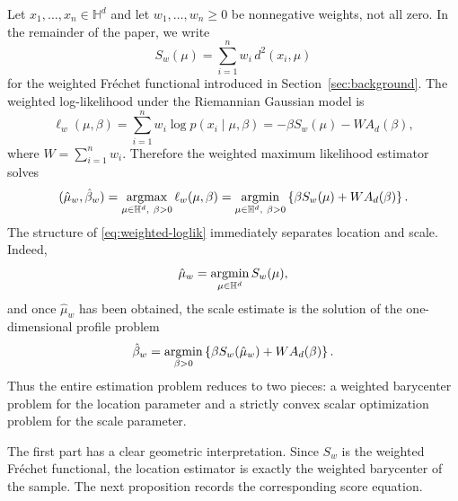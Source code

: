 \documentclass[11pt]{article}
\begin{document}
Let \(x_1,\ldots,x_n\in\mathbb{H}^d\) and let \(w_1,\ldots,w_n\ge 0\) be nonnegative weights, not all zero. In the remainder of the paper, we write
\begin{equation}\label{eq:weighted-variance}
S_w(\mu)
=
\sum_{i=1}^n w_i\,d^2(x_i,\mu)
\end{equation}
for the weighted Fr\'echet functional introduced in Section~\ref{sec:background}. The weighted log-likelihood under the Riemannian Gaussian model is
\begin{equation}\label{eq:weighted-loglik}
\ell_w(\mu,\beta)
=
\sum_{i=1}^n w_i\log p(x_i\mid\mu,\beta)
=
-\beta S_w(\mu)-W A_d(\beta),
\end{equation}
where \(W=\sum_{i=1}^n w_i\). Therefore the weighted maximum likelihood estimator solves
\begin{equation}\label{eq:weighted-mle-problem}
(\hat{\mu}_w,\hat{\beta}_w)
=
\operatorname*{argmax}_{\mu\in\mathbb{H}^d,\ \beta>0}\ell_w(\mu,\beta)
=
\operatorname*{argmin}_{\mu\in\mathbb{H}^d,\ \beta>0}
\left\{
\beta S_w(\mu)+W A_d(\beta)
\right\}.
\end{equation}
The structure of \eqref{eq:weighted-loglik} immediately separates location and scale. Indeed,
\begin{equation}\label{eq:location-profile}
\hat{\mu}_w
=
\operatorname*{argmin}_{\mu\in\mathbb{H}^d} S_w(\mu),
\end{equation}
and once \(\hat{\mu}_w\) has been obtained, the scale estimate is the solution of the one-dimensional profile problem
\begin{equation}\label{eq:scale-profile}
\hat{\beta}_w
=
\operatorname*{argmin}_{\beta>0}
\left\{
\beta S_w(\hat{\mu}_w)+W A_d(\beta)
\right\}.
\end{equation}
Thus the entire estimation problem reduces to two pieces: a weighted barycenter problem for the location parameter and a strictly convex scalar optimization problem for the scale parameter.

The first part has a clear geometric interpretation. Since \(S_w\) is the weighted Fr\'echet functional, the location estimator is exactly the weighted barycenter of the sample. The next proposition records the corresponding score equation.
\end{document}
